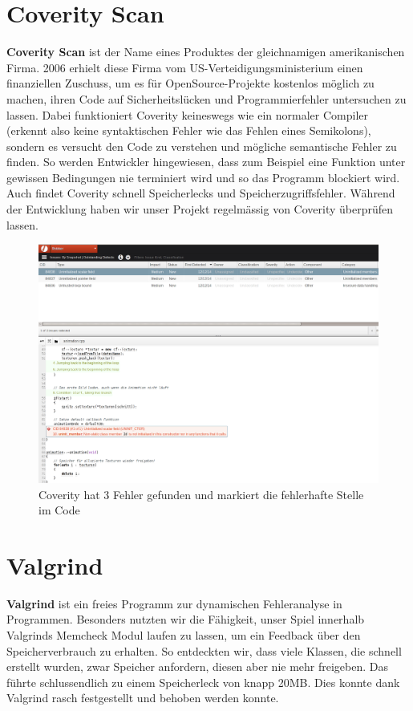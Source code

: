 \documentclass[11pt,a4paper]{scrbook}
\begin{document}
\section{Coverity Scan}
\textbf{Coverity Scan} ist der Name eines Produktes der gleichnamigen amerikanischen Firma. 2006 erhielt diese Firma vom US-Verteidigungsministerium
einen finanziellen Zuschuss, um es für OpenSource-Projekte kostenlos möglich zu machen, ihren Code auf Sicherheitslücken und Programmierfehler untersuchen
zu lassen. Dabei funktioniert Coverity keineswegs wie ein normaler Compiler (erkennt also keine syntaktischen Fehler wie das Fehlen eines Semikolons),
sondern es versucht den Code zu verstehen und mögliche semantische Fehler zu finden. So werden Entwickler hingewiesen, dass zum Beispiel eine Funktion
unter gewissen Bedingungen nie terminiert wird und so das Programm blockiert wird. Auch findet Coverity schnell Speicherlecks und Speicherzugriffsfehler.
Während der Entwicklung haben wir unser Projekt regelmässig von Coverity überprüfen lassen.
\begin{figure}
\centering
\includegraphics[scale=0.4]{img/coverity.png}
\caption{Coverity hat 3 Fehler gefunden und markiert die fehlerhafte Stelle im Code}
\end{figure}

\section{Valgrind}
\textbf{Valgrind} ist ein freies Programm zur dynamischen Fehleranalyse in Programmen. Besonders nutzten wir die Fähigkeit,
unser Spiel innerhalb Valgrinds Memcheck Modul laufen zu lassen, um ein Feedback über den Speicherverbrauch zu erhalten. So entdeckten
wir, dass viele Klassen, die schnell erstellt wurden, zwar Speicher anfordern, diesen aber nie mehr freigeben.
Das führte schlussendlich zu einem Speicherleck von knapp 20MB. Dies konnte dank Valgrind rasch festgestellt und behoben werden konnte.
\end{document}
